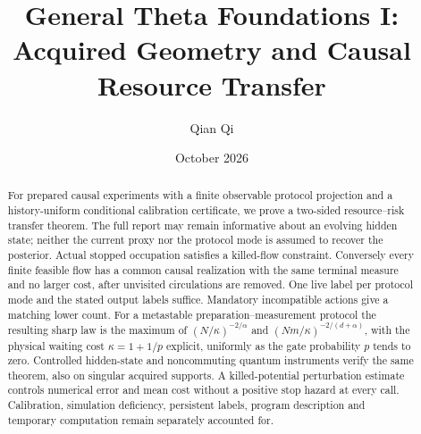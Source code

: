 \documentclass[11pt,reqno]{amsart}
\title[Acquired geometry and causal resource transfer]{General Theta Foundations I:\\Acquired Geometry and Causal Resource Transfer}
\author{Qian Qi}
\date{October 2026}
\numberwithin{equation}{section}
\theoremstyle{definition}
\theoremstyle{remark}
\begin{document}
\begin{abstract}
For prepared causal experiments with a finite observable protocol projection and a history-uniform conditional calibration certificate, we prove a two-sided resource--risk transfer theorem. The full report may remain informative about an evolving hidden state; neither the current proxy nor the protocol mode is assumed to recover the posterior. Actual stopped occupation satisfies a killed-flow constraint. Conversely every finite feasible flow has a common causal realization with the same terminal measure and no larger cost, after unvisited circulations are removed. One live label per protocol mode and the stated output labels suffice. Mandatory incompatible actions give a matching lower count. For a metastable preparation--measurement protocol the resulting sharp law is the maximum of $(N/\kappa)^{-2/\alpha}$ and $(Nm/\kappa)^{-2/(d+\alpha)}$, with the physical waiting cost $\kappa=1+1/p$ explicit, uniformly as the gate probability $p$ tends to zero. Controlled hidden-state and noncommuting quantum instruments verify the same theorem, also on singular acquired supports. A killed-potential perturbation estimate controls numerical error and mean cost without a positive stop hazard at every call. Calibration, simulation deficiency, persistent labels, program description and temporary computation remain separately accounted for.
\end{abstract}
\maketitle








\appendix



\end{document}
